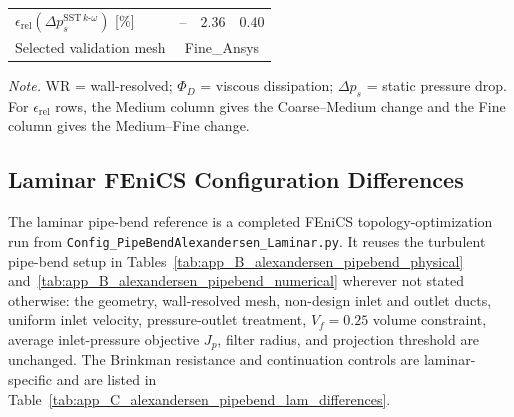 \begin{table}[htbp]
\begin{tabular*}{\textwidth}{@{\extracolsep{\fill}}lccc@{}}
		$\epsilon_{\mathrm{rel}}(\Delta p_s^{\mathrm{SST}\,k\text{-}\omega})$ [\%] & -- & $2.36$ & $0.40$ \\
		Selected validation mesh & \multicolumn{3}{c}{Fine\_Ansys} \\
		\hline
	\end{tabular*}
	\vspace{2pt}
	\begin{minipage}{0.98\textwidth}
		\scriptsize \textit{Note.} WR = wall-resolved; $\Phi_D$ = viscous dissipation; $\Delta p_s$ = static pressure drop. For $\epsilon_{\mathrm{rel}}$ rows, the Medium column gives the Coarse--Medium change and the Fine column gives the Medium--Fine change.
	\end{minipage}
\end{table}

\FloatBarrier

\subsection{Laminar FEniCS Configuration Differences}
\label{subsec:app_C_alexandersen_pipebend_lam_config}
	The laminar pipe-bend reference is a completed FEniCS topology-optimization run from \texttt{Config\_PipeBendAlexandersen\_Laminar.py}. It reuses the turbulent pipe-bend setup in Tables~\ref{tab:app_B_alexandersen_pipebend_physical} and~\ref{tab:app_B_alexandersen_pipebend_numerical} wherever not stated otherwise: the geometry, wall-resolved mesh, non-design inlet and outlet ducts, uniform inlet velocity, pressure-outlet treatment, $V_f=0.25$ volume constraint, average inlet-pressure objective $J_p$, filter radius, and projection threshold are unchanged. The Brinkman resistance and continuation controls are laminar-specific and are listed in Table~\ref{tab:app_C_alexandersen_pipebend_lam_differences}.

